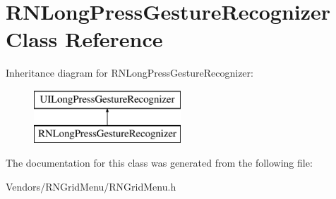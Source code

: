 \hypertarget{interface_r_n_long_press_gesture_recognizer}{}\section{R\+N\+Long\+Press\+Gesture\+Recognizer Class Reference}
\label{interface_r_n_long_press_gesture_recognizer}
Inheritance diagram for R\+N\+Long\+Press\+Gesture\+Recognizer\+:\begin{figure}[H]
\begin{center}
\leavevmode
\includegraphics[height=2.000000cm]{interface_r_n_long_press_gesture_recognizer}
\end{center}
\end{figure}


The documentation for this class was generated from the following file\+:\begin{DoxyCompactItemize}
\item 
Vendors/\+R\+N\+Grid\+Menu/R\+N\+Grid\+Menu.\+h\end{DoxyCompactItemize}
